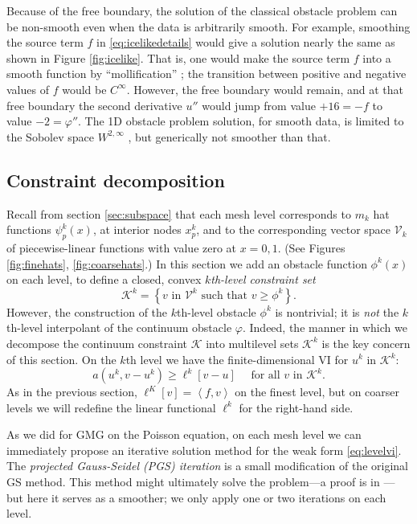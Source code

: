 \documentclass[letterpaper,final,12pt,reqno]{amsart}
\newcommand{\ip}[2]{\left<#1,#2\right>}
\numberwithin{equation}{section}
\numberwithin{figure}{section}
\numberwithin{table}{section}
\begin{document}
Because of the free boundary, the solution of the classical obstacle problem can be non-smooth even when the data is arbitrarily smooth.  For example, smoothing the source term $f$ in \eqref{eq:icelikedetails} would give a solution nearly the same as shown in Figure \ref{fig:icelike}.  That is, one would make the source term $f$ into a smooth function by ``mollification'' \cite{Evans2010}; the transition between positive and negative values of $f$ would be $C^\infty$.  However, the free boundary would remain, and at that free boundary the second derivative $u''$ would jump from value $+16=-f$ to value $-2=\varphi''$.  The 1D obstacle problem solution, for smooth data, is limited to the Sobolev space $W^{2,\infty}$ \cite[section IV.6]{KinderlehrerStampacchia1980}, but generically not smoother than that.

\subsection*{Constraint decomposition}  Recall from section \ref{sec:subspace} that each mesh level corresponds to $m_k$ hat functions $\psi_p^k(x)$, at interior nodes $x_p^k$, and to the corresponding vector space $\mathcal{V}_k$ of piecewise-linear functions with value zero at $x=0,1$.  (See Figures \ref{fig:finehats}, \ref{fig:coarsehats}.)  In this section we add an obstacle function $\phi^k(x)$ on each level, to define a closed, convex $k$\emph{th-level constraint set}
\begin{equation}
\mathcal{K}^k = \left\{v \text{ in } \mathcal{V}^k \text{ such that } v \ge \phi^k\right\}.  \label{eq:levelKdefine}
\end{equation}
However, the construction of the $k$th-level obstacle $\phi^k$ is nontrivial; it is \emph{not} the $k$th-level interpolant of the continuum obstacle $\varphi$.  Indeed, the manner in which we decompose the continuum constraint $\mathcal{K}$ into multilevel sets $\mathcal{K}^k$ is the key concern of this section.  On the $k$th level we have the finite-dimensional VI for $u^k$ in $\mathcal{K}^k$:
\begin{equation}
  a(u^k,v-u^k) \ge \ell^k[v-u] \quad \text{ for all } v \text{ in } \mathcal{K}^k. \label{eq:levelvi}
\end{equation}
As in the previous section, $\ell^K[v]=\ip{f}{v}$ on the finest level, but on coarser levels we will redefine the linear functional $\ell^k$ for the right-hand side.

As we did for GMG on the Poisson equation, on each mesh level we can immediately propose an iterative solution method for the weak form \eqref{eq:levelvi}.  The \emph{projected Gauss-Seidel (PGS) iteration} is a small modification of the original GS method.  This method might ultimately solve the problem---a proof is in \cite{BrandtCryer1983}---but here it serves as a smoother; we only apply one or two iterations on each level.
\end{document}
